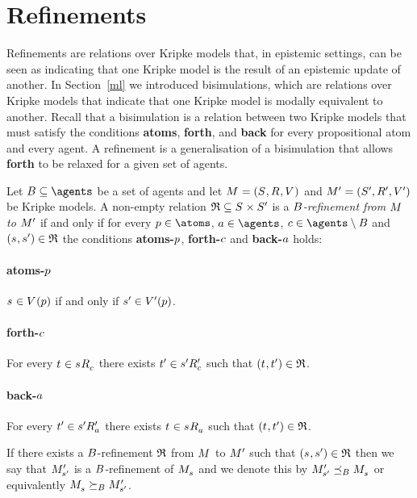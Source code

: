 \section{Refinements}\label{rml-refinements}

Refinements are relations over Kripke models that, in epistemic settings, can be seen as indicating that one Kripke model is the result of an epistemic update of another.
In Section~\ref{ml} we introduced bisimulations, which are relations over Kripke models that indicate that one Kripke model is modally equivalent to another.
Recall that a bisimulation is a relation between two Kripke models that must satisfy the conditions {\bf atoms}, {\bf forth}, and {\bf back} for every propositional atom and every agent.
A refinement is a generalisation of a bisimulation that allows {\bf forth} to be relaxed for a given set of agents.

\begin{definition}[Refinements]\label{refinements}
Let $\agentsB \subseteq \agents$ be a set of agents and let $\kModelAndTuple$ and $\kModelAndTupleP$ be Kripke models.
A non-empty relation $\refinement \subseteq \kStates \times \kStatesP$ is a {\em $B$-refinement from $\kModel$ to ${M^{\prime}_{}}$} if and only if for every $\atomP \in \atoms$, $\agentA \in \agents$, $\agentC \in \agents \setminus \agentsB$ and $(\kStateS, \kStateSP) \in \refinement$ the conditions {\bf atoms-$p$}, {\bf forth-$c$} and {\bf back-$a$} holds:

\paragraph{atoms-$p$}
$\kStateS \in \kValuation(\atomP)$ if and only if ${s}^{\prime} \in {V^{\prime}}(p)$.

\paragraph{forth-$c$}
For every $\kStateT \in \kSuccessorsC{\kStateS}$ there exists ${t}^{\prime} \in {{s}^{\prime}} {R^{\prime}_{c}}$ such that $(\kStateT, \kStateTP) \in \refinement$.

\paragraph{back-$a$}
For every ${t}^{\prime} \in {{s}^{\prime}} {R^{\prime}_{a}}$ there exists $\kStateT \in \kSuccessorsA{\kStateS}$ such that $(\kStateT, \kStateTP) \in \refinement$.

If there exists a $B$-refinement $\mathfrak{R}$ from $\kModel$ to ${M^{\prime}_{}}$ such that $(\kStateS, \kStateSP) \in \refinement$ then we say that ${M^{\prime}_{{s}^{\prime}}}$ is a $B$-refinement of $\kPModel{\kStateS}$ and we denote this by $\kPModelP{\kStateSP} \refinesBs \kPModel{\kStateS}$ or equivalently $\kPModel{\kStateS} \simulatesBs \kPModelP{\kStateSP}$.
\end{definition}

